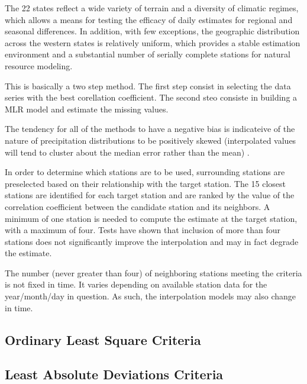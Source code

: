 \documentclass[WHATMANUAL.tex]{subfiles}
\begin{document}
The 22 states reflect a wide variety of terrain and a diversity of climatic regimes, which allows a means for testing the efficacy of daily estimates for regional and seasonal differences. In addition, with few exceptions, the geographic distribution across the western states is relatively uniform, which provides a stable estimation environment and a substantial number of serially complete stations for natural resource modeling.

This is basically a two step method. The first step consist in selecting the data series with the best corellation coefficient. The second steo consiste in building a MLR model and estimate the missing values.

The tendency for all of the methods to have a negative bias is indicateive of the nature of precipitation distributions to be positively skewed (interpolated values will tend to cluster about the median error rather than the mean) \citep{eischeid_quality_1995}.

In order to determine which stations are to be used, surrounding stations are preselected based on their relationship with the target station. The 15 closest stations are identified for each target station and are ranked by the value of the correlation coefficient between the candidate station and its neighbors. A minimum of one station is needed to compute the estimate at the target station, with a maximum of four. Tests have shown that inclusion of more than four stations does not significantly improve the interpolation and may in fact degrade the estimate.

The number (never greater than four) of neighboring stations meeting the criteria is not fixed in time. It varies depending on available station data for the year/month/day in question. As such, the interpolation models may also change in time.

\subsection{Ordinary Least Square Criteria}

\subsection{Least Absolute Deviations Criteria}
\end{document}
